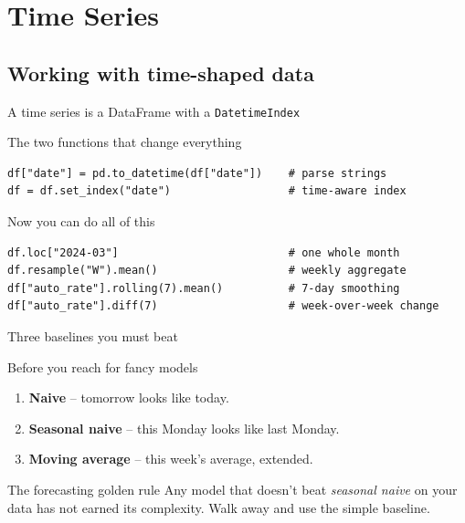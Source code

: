 \documentclass[aspectratio=169,11pt]{beamer}
\begin{document}
\section{Time Series}

\subsection{Working with time-shaped data}

\begin{frame}[fragile]{A time series is a DataFrame with a \texttt{DatetimeIndex}}
  \begin{block}{The two functions that change everything}
\begin{lstlisting}
df["date"] = pd.to_datetime(df["date"])    # parse strings
df = df.set_index("date")                  # time-aware index
\end{lstlisting}
  \end{block}
  \vspace{6pt}
  \begin{exampleblock}{Now you can do all of this}
\begin{lstlisting}
df.loc["2024-03"]                          # one whole month
df.resample("W").mean()                    # weekly aggregate
df["auto_rate"].rolling(7).mean()          # 7-day smoothing
df["auto_rate"].diff(7)                    # week-over-week change
\end{lstlisting}
  \end{exampleblock}
\end{frame}

\begin{frame}{Three baselines you must beat}
  \begin{block}{Before you reach for fancy models}
    \begin{enumerate}
      \item \textbf{Naive} -- tomorrow looks like today.
      \item \textbf{Seasonal naive} -- this Monday looks like last Monday.
      \item \textbf{Moving average} -- this week's average, extended.
    \end{enumerate}
  \end{block}
  \vspace{4pt}
  \begin{alertblock}{The forecasting golden rule}
    Any model that doesn't beat \emph{seasonal naive} on your data has not earned its complexity.
    Walk away and use the simple baseline.
  \end{alertblock}
\end{frame}
\end{document}
